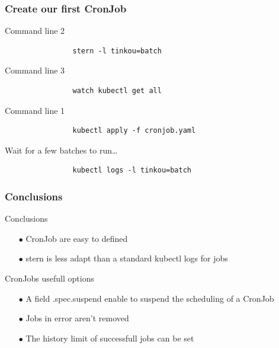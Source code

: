	\begin{frame}[fragile]
		\frametitle{Create our first CronJob}
		
		\begin{block}{Command line 2}
			\begin{verbatim}
				stern -l tinkou=batch
			\end{verbatim}
		\end{block}
		
		\begin{block}{Command line 3}
			\begin{verbatim}
				watch kubectl get all
			\end{verbatim}
		\end{block}
		
		\begin{block}{Command line 1}
			\begin{verbatim}
				kubectl apply -f cronjob.yaml
			\end{verbatim}
			Wait for a few batches to run…
			\begin{verbatim}
				kubectl logs -l tinkou=batch
			\end{verbatim}
		\end{block}
	\end{frame}

	\begin{frame}
		\frametitle{Conclusions}
		
		\begin{block}{Conclusions}
			\begin{itemize}
				\item[$\bullet$] CronJob are easy to defined
				\item[$\bullet$] stern is less adapt than a standard kubectl logs for jobs
			\end{itemize}
		\end{block}
		
		\begin{block}{CronJobs usefull options}
			\begin{itemize}
				\item[$\bullet$] A field .spec.suspend enable to suspend the scheduling of a CronJob
				\item[$\bullet$] Jobs in error aren't removed
				\item[$\bullet$] The history limit of successfull jobs can be set
			\end{itemize}
		
		\end{block}
	\end{frame}
	
